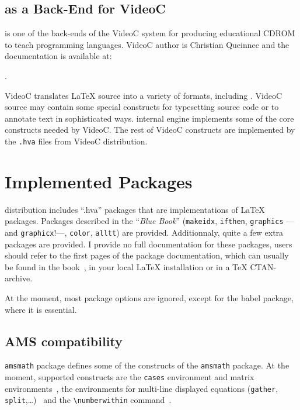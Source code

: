 \subsection{\hevea{} as a Back-End for VideoC}
\hevea{} is one of the back-ends of the VideoC system for producing
educational CDROM to teach programming languages.
VideoC author is Christian Queinnec and the documentation is available
at:
\begin{center}
.
\end{center}


VideoC translates \LaTeX{} source into a variety of formats, including
\html. VideoC source may contain some special constructs for
typesetting source code or to annotate text in sophisticated ways.
\hevea{} internal engine implements some of the core constructs needed
by VideoC. The rest of VideoC constructs are implemented by
the \texttt{.hva} files from VideoC distribution.


\section{Implemented Packages}\label{implemented:package}
%
\hevea{} distribution includes ``.hva'' packages that are
implementations of \LaTeX{} packages.
Packages described in the ``\emph{Blue Book}'' (\texttt{makeidx},
\texttt{ifthen}, \texttt{graphics} ---and \texttt{graphicx}!---,
\texttt{color}, \texttt{alltt}) are provided.  Additionnaly, quite a
few extra packages are provided.  I provide no full documentation for
these packages, users should refer to the first pages of the package
documentation, which can usually be found in the book~\cite{latexbis},
in your local
\LaTeX{} installation or in a TeX CTAN-archive.

At the moment, most package options are ignored, except for the babel
package, where it is essential.

\subsection{AMS compatibility}
%
\hevea{} \texttt{amsmath} package defines  some of the constructs of the
\texttt{amsmath} package.  At the moment, supported constructs are
the \verb+cases+ environment and matrix
environments~\cite[Section~8.4]{latexbis}, the
environments for multi-line displayed
equations (\verb+gather+,
\verb+split+,\ldots)~\cite[Section~8.5]{latexbis} and the
\verb+\numberwithin+ command~\cite[Section~8.6.2]{latexbis}.

